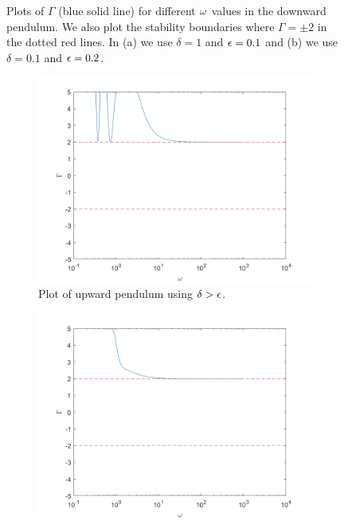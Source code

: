 \documentclass[12pt]{report}
\begin{document}
\begin{solution}
\begin{enumerate}
\begin{figure}[H]
            \caption{Plots of $\Gamma$ (blue solid line) for different ${\omega}$ values in the downward pendulum. We also plot the stability boundaries where $\Gamma = \pm 2$ in the dotted red lines. In (a) we use $\delta = 1$ and ${\epsilon} = 0.1$ and (b) we use $\delta = 0.1$ and ${\epsilon} = 0.2$. }
            \label{fig3}
        \end{figure}
        \begin{figure}[H]
            \begin{subfigure}[b]{0.5\linewidth}
                \centering
                \includegraphics[width=\linewidth]{images/nlu1.png}
                \caption{Plot of upward pendulum using $\delta > {\epsilon}$.}
                \label{fig4:a}
                \vspace{4ex}
            \end{subfigure}%
            \begin{subfigure}[b]{0.5\linewidth}
                \centering
                \includegraphics[width=\linewidth]{images/nlu2.png}

\end{subfigure}
\end{figure}
\end{enumerate}
\end{solution}
\end{document}
